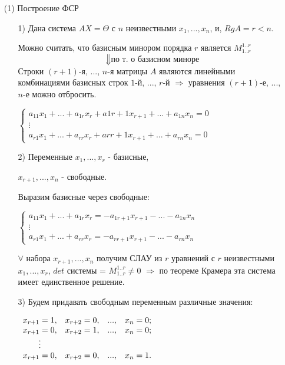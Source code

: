 \begin{enumerate}
    \item[(1)] Построение ФСР
    \begin{enumerate}
        \item[1)] Дана система $AX = \Theta$ с $n$ неизвестными $x_1, ..., x_n$, и, $RgA = r < n$.

        Можно считать, что базисным минором порядка $r$ является $M^{1..r}_{1..r}$
        $$\Downarrow\text{по т. о базисном миноре}$$
        Строки $(r + 1)$-я, ..., $n$-я матрицы $A$ являются линейными комбинациями базисных строк $1$-й, ..., $r$-й $\Rightarrow$ уравнения $(r + 1)$-е, ..., $n$-е можно отбросить.

        $\begin{cases} a_{11}x_1 + ... + a_{1r}x_r + a{1 r+1}x_{r+1} + ... + a_{1n}x_n = 0\\\vdots\\a_{r1}x_1 + ... + a_{rr}x_r + a{r r+1}x_{r+1} + ... + a_{rn}x_n = 0\end{cases}$

        \item[2)] Переменные $x_1, ..., x_r$ - базисные,

        $x_{r+1}, ..., x_n$ - свободные.

        Выразим базисные через свободные:

        $\begin{cases} a_{11}x_1 + ... + a_{1r}x_r = - a_{1 r+1}x_{r+1} - ... - a_{1n}x_n\\\vdots\\a_{r1}x_1 + ... + a_{rr}x_r = - a_{r r+1}x_{r+1} - ... - a_{rn}x_n\end{cases}$

        $\forall$ набора $x_{r+1}, ..., x_n$ получим СЛАУ из $r$ уравнений с $r$ неизвестными $x_1, ..., x_r$, $det$ системы = $M^{1..r}_{1..r} \ne 0$ $\Rightarrow$ по теореме Крамера эта система имеет единственное решение.

        \item[3)] Будем придавать свободным переменным различные значения:

        $\begin{array}{ c c c c } 
            x_{r+1} = 1, & x_{r+2} = 0, & ..., & x_n = 0;\\ 
            x_{r+1} = 0, & x_{r+2} = 1, & ..., & x_n = 0;\\ 
            \vdots & & & \\  
            x_{r+1} = 0, & x_{r+2} = 0, & ..., & x_n = 1.\\
           \end{array} $


\end{enumerate}
\end{enumerate}
